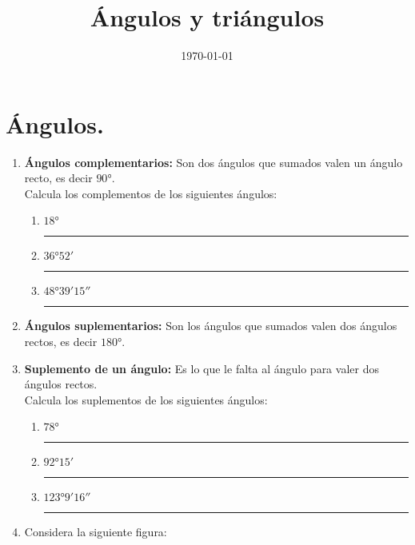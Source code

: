 \documentclass[12pt]{article}
\title{\vspace*{-2cm}Ángulos y triángulos\vspace{-5ex}}
\date{\today}
\begin{document}
\maketitle

\section{Ángulos.}

\begin{enumerate}
\item \textbf{Ángulos complementarios: } Son dos ángulos que sumados valen un ángulo recto, es decir $\ang{90}$.
\\
Calcula los complementos de los siguientes ángulos:
\begin{enumerate}
\item $\ang{18}$ \hspace{1cm} \rule{1.5cm}{0.7pt}
\item $\ang{36;52;}$ \hspace{1cm} \rule{1.5cm}{0.7pt}
\item $\ang{48;39;15}$ \hspace{1cm} \rule{1.5cm}{0.7pt}
\end{enumerate}
\item \textbf{Ángulos suplementarios: } Son los ángulos que sumados valen dos ángulos rectos, es decir $\ang{180}$.
\item \textbf{Suplemento de un ángulo: } Es lo que le falta al ángulo para valer dos ángulos rectos.
\\
Calcula los suplementos de los siguientes ángulos:
\begin{enumerate}
\item $\ang{78}$ \hspace{1cm} \rule{1.5cm}{0.7pt}
\item $\ang{92;15;}$ \hspace{1cm} \rule{1.5cm}{0.7pt}
\item $\ang{123;9;16}$ \hspace{1cm} \rule{1.5cm}{0.7pt}
\end{enumerate}
\item Considera la siguiente figura:
\begin{figure}[H]
\centering
{}
\end{figure}
\end{enumerate}
\end{document}
